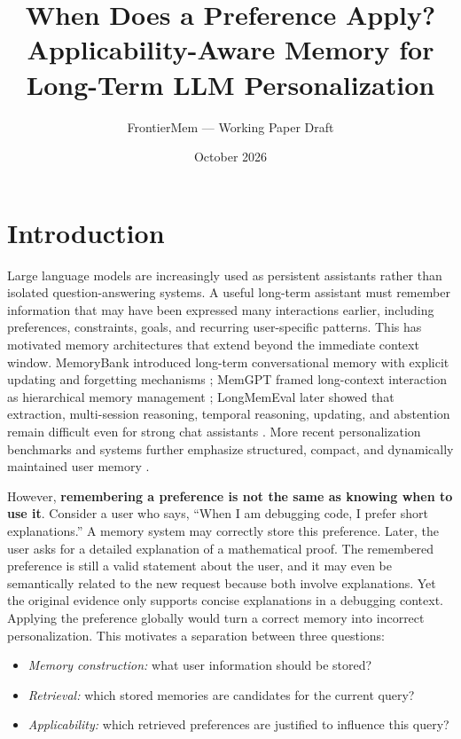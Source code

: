 \documentclass[11pt]{article}
\title{\vspace{-1.3em}\textbf{When Does a Preference Apply?}\\
\large Applicability-Aware Memory for Long-Term LLM Personalization}
\author{FrontierMem --- Working Paper Draft}
\date{October 2026}
\begin{document}
\maketitle
\vspace{-1.2em}

\section{Introduction}

Large language models are increasingly used as persistent assistants rather than isolated question-answering systems. A useful long-term assistant must remember information that may have been expressed many interactions earlier, including preferences, constraints, goals, and recurring user-specific patterns. This has motivated memory architectures that extend beyond the immediate context window. MemoryBank introduced long-term conversational memory with explicit updating and forgetting mechanisms \cite{zhong2024memorybank}; MemGPT framed long-context interaction as hierarchical memory management \cite{packer2023memgpt}; LongMemEval later showed that extraction, multi-session reasoning, temporal reasoning, updating, and abstention remain difficult even for strong chat assistants \cite{wu2025longmemeval}. More recent personalization benchmarks and systems further emphasize structured, compact, and dynamically maintained user memory \cite{jiang2025personamemv2,zhao2026insideout,hou2026personatree,wang2026qumem}.

However, \textbf{remembering a preference is not the same as knowing when to use it}. Consider a user who says, ``When I am debugging code, I prefer short explanations.'' A memory system may correctly store this preference. Later, the user asks for a detailed explanation of a mathematical proof. The remembered preference is still a valid statement about the user, and it may even be semantically related to the new request because both involve explanations. Yet the original evidence only supports concise explanations in a debugging context. Applying the preference globally would turn a correct memory into incorrect personalization. This motivates a separation between three questions:
\begin{itemize}
    \item \emph{Memory construction:} what user information should be stored?
    \item \emph{Retrieval:} which stored memories are candidates for the current query?
    \item \emph{Applicability:} which retrieved preferences are justified to influence this query?
\end{itemize}
\end{document}
